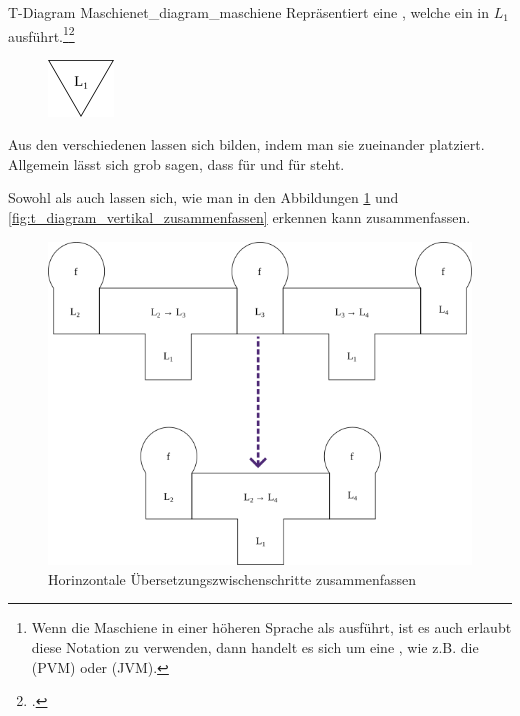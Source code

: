 \begin{Definition}{T-Diagram Maschiene}{t_diagram_maschiene}
  Repräsentiert eine , welche ein  in  $L_1$ ausführt.\footnote{Wenn die Maschiene  in einer höheren Sprache als  ausführt, ist es auch erlaubt diese Notation zu verwenden, dann handelt es sich um eine , wie z.B. die  (PVM) oder  (JVM).}\footcite{earley_formalism_1970}
  \begin{figure}[H]
    \centering
    \includegraphics[height=1.5cm]{./figures/machiene.png}
  \end{figure}
\end{Definition}

Aus den verschiedenen  lassen sich  bilden, indem man sie  zueinander platziert. Allgemein lässt sich grob sagen, dass  für  und   für  steht.

Sowohl  als auch  lassen sich, wie man in den Abbildungen \ref{fig:t_diagram_horinzontal_zusammenfassen} und \ref{fig:t_diagram_vertikal_zusammenfassen} erkennen kann zusammenfassen.

\begin{figure}[H]
  \centering
  \includegraphics[width=0.66\linewidth]{./figures/summarize_compiler.png}
  \caption{Horinzontale Übersetzungszwischenschritte zusammenfassen}
  \label{fig:t_diagram_horinzontal_zusammenfassen}
\end{figure}


